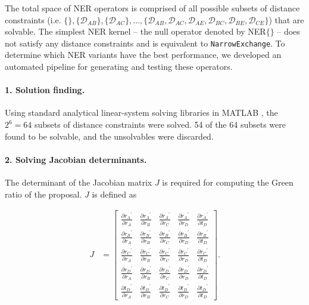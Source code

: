 \documentclass[10pt,letterpaper]{article}
\begin{document}
The total space of NER operators is comprised of all possible subsets of distance constraints (i.e. $\{\},\{\mathcal{D}_{AB}\}, \{\mathcal{D}_{AC}\}, \dotso , \{\mathcal{D}_{AB}, \mathcal{D}_{AC}, \mathcal{D}_{AE}, \mathcal{D}_{BC}, \mathcal{D}_{BE}, \mathcal{D}_{CE} \}$) that are solvable. 
The simplest NER kernel -- the null operator denoted by NER$\{\}$ -- does not satisfy any distance constraints and is equivalent to \texttt{NarrowExchange}. 
To determine which NER variants have the best performance, we developed an automated pipeline for generating and testing these operators.


\paragraph{1. Solution finding.} Using standard analytical linear-system solving libraries in MATLAB \cite{higham2016matlab}, the $2^6=64$ subsets of distance constraints were solved. 54 of the 64 subsets were found to be solvable, and the unsolvables were discarded.


\paragraph{2. Solving Jacobian determinants.} The determinant of the Jacobian matrix $J$ is required for computing the Green ratio of the proposal. $J$ is defined as 


\begin{align}
	J &= \begin{bmatrix} \frac{\partial {r_A}^\prime}{\partial r_A} & \frac{\partial {r_A}^\prime}{\partial r_B} & \frac{\partial {r_A}^\prime}{\partial r_C} & \frac{\partial {r_A}^\prime}{\partial r_D} & \frac{\partial {r_A}^\prime}{\partial t_D} \\
	\frac{\partial {r_B}^\prime}{\partial r_A} & \frac{\partial {r_B}^\prime}{\partial r_B} & \frac{\partial {r_B}^\prime}{\partial r_C} & \frac{\partial {r_B}^\prime}{\partial r_D} & \frac{\partial {r_B}^\prime}{\partial t_D} \\
	\frac{\partial {r_C}^\prime}{\partial r_A} & \frac{\partial {r_C}^\prime}{\partial r_B} & \frac{\partial {r_C}^\prime}{\partial r_C} & \frac{\partial {r_C}^\prime}{\partial r_D} & \frac{\partial {r_C}^\prime}{\partial t_D} \\
	\frac{\partial {r_D}^\prime}{\partial r_A} & \frac{\partial {r_D}^\prime}{\partial r_B} & \frac{\partial {r_D}^\prime}{\partial r_C} & \frac{\partial {r_D}^\prime}{\partial r_D} & \frac{\partial {r_D}^\prime}{\partial t_D} \\
\frac{\partial {t_D}^\prime}{\partial r_A} & \frac{\partial {t_D}^\prime}{\partial r_B} & \frac{\partial {t_D}^\prime}{\partial r_C} & \frac{\partial {t_D}^\prime}{\partial r_D} & \frac{\partial {t_D}^\prime}{\partial t_D}\end{bmatrix}.  \nonumber  \\
\end{align}
\end{document}
